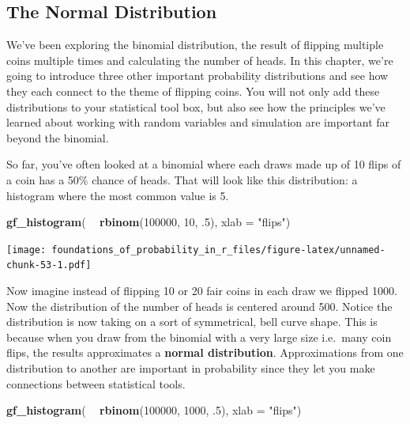 \documentclass[]{article}
\newenvironment{Shaded}{\begin{snugshade}}{\end{snugshade}}
\newcommand{\DataTypeTok}[1]{\textcolor[rgb]{0.13,0.29,0.53}{#1}}
\newcommand{\DecValTok}[1]{\textcolor[rgb]{0.00,0.00,0.81}{#1}}
\newcommand{\FloatTok}[1]{\textcolor[rgb]{0.00,0.00,0.81}{#1}}
\newcommand{\KeywordTok}[1]{\textcolor[rgb]{0.13,0.29,0.53}{\textbf{#1}}}
\newcommand{\NormalTok}[1]{#1}
\newcommand{\OperatorTok}[1]{\textcolor[rgb]{0.81,0.36,0.00}{\textbf{#1}}}
\newcommand{\StringTok}[1]{\textcolor[rgb]{0.31,0.60,0.02}{#1}}
\begin{document}
\hypertarget{the-normal-distribution}{%
\subsection{The Normal Distribution}\label{the-normal-distribution}}

We've been exploring the binomial distribution, the result of flipping
multiple coins multiple times and calculating the number of heads. In
this chapter, we're going to introduce three other important probability
distributions and see how they each connect to the theme of flipping
coins. You will not only add these distributions to your statistical
tool box, but also see how the principles we've learned about working
with random variables and simulation are important far beyond the
binomial.

So far, you've often looked at a binomial where each draws made up of 10
flips of a coin has a 50\% chance of heads. That will look like this
distribution: a histogram where the most common value is 5.

\begin{Shaded}
\begin{Highlighting}[]
\KeywordTok{gf_histogram}\NormalTok{( }\OperatorTok{~}\StringTok{ }\KeywordTok{rbinom}\NormalTok{(}\DecValTok{100000}\NormalTok{, }\DecValTok{10}\NormalTok{, }\FloatTok{.5}\NormalTok{), }\DataTypeTok{xlab =} \StringTok{"flips"}\NormalTok{)}
\end{Highlighting}
\end{Shaded}

\texttt{[image: foundations\_of\_probability\_in\_r\_files/figure-latex/unnamed-chunk-53-1.pdf]}

Now imagine instead of flipping 10 or 20 fair coins in each draw we
flipped 1000. Now the distribution of the number of heads is centered
around 500. Notice the distribution is now taking on a sort of
symmetrical, bell curve shape. This is because when you draw from the
binomial with a very large size i.e.~many coin flips, the results
approximates a \textbf{normal distribution}. Approximations from one
distribution to another are important in probability since they let you
make connections between statistical tools.

\begin{Shaded}
\begin{Highlighting}[]
\KeywordTok{gf_histogram}\NormalTok{( }\OperatorTok{~}\StringTok{ }\KeywordTok{rbinom}\NormalTok{(}\DecValTok{100000}\NormalTok{, }\DecValTok{1000}\NormalTok{, }\FloatTok{.5}\NormalTok{), }\DataTypeTok{xlab =} \StringTok{"flips"}\NormalTok{)}
\end{Highlighting}
\end{Shaded}
\end{document}

